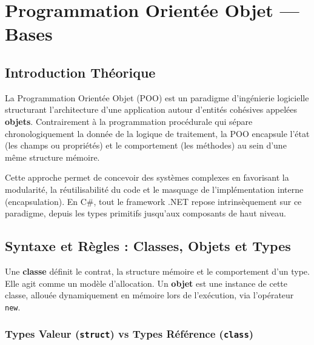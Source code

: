 
\newpage
\section{Programmation Orientée Objet — Bases}

\subsection{Introduction Théorique}

La Programmation Orientée Objet (POO) est un paradigme d'ingénierie logicielle structurant l'architecture d'une application autour d'entités cohésives appelées \textbf{objets}. Contrairement à la programmation procédurale qui sépare chronologiquement la donnée de la logique de traitement, la POO encapsule l'état (les champs ou propriétés) et le comportement (les méthodes) au sein d'une même structure mémoire.

Cette approche permet de concevoir des systèmes complexes en favorisant la modularité, la réutilisabilité du code et le masquage de l'implémentation interne (encapsulation). En C\#, tout le framework .NET repose intrinsèquement sur ce paradigme, depuis les types primitifs jusqu'aux composants de haut niveau.

\subsection{Syntaxe et Règles : Classes, Objets et Types}

Une \textbf{classe} définit le contrat, la structure mémoire et le comportement d'un type. Elle agit comme un modèle d'allocation. Un \textbf{objet} est une instance de cette classe, allouée dynamiquement en mémoire lors de l'exécution, via l'opérateur \texttt{new}.

\subsubsection{Types Valeur (\texttt{struct}) vs Types Référence (\texttt{class})}

